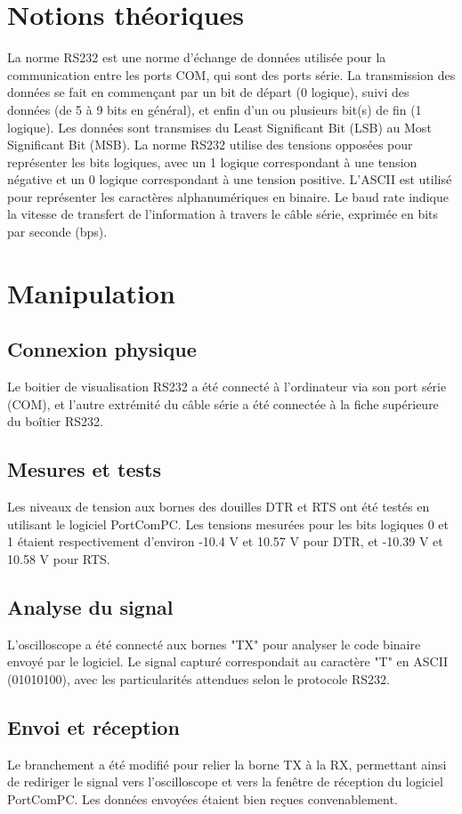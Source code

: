\documentclass[12pt, letterpaper]{report}
\begin{document}
\chapter{Notions théoriques}
La norme RS232 est une norme d'échange de données utilisée pour la communication entre les ports COM, qui sont des ports série. La transmission des données se fait en commençant par un bit de départ (0 logique), suivi des données (de 5 à 9 bits en général), et enfin d'un ou plusieurs bit(s) de fin (1 logique). Les données sont transmises du Least Significant Bit (LSB) au Most Significant Bit (MSB). La norme RS232 utilise des tensions opposées pour représenter les bits logiques, avec un 1 logique correspondant à une tension négative et un 0 logique correspondant à une tension positive. L'ASCII est utilisé pour représenter les caractères alphanumériques en binaire. Le baud rate indique la vitesse de transfert de l'information à travers le câble série, exprimée en bits par seconde (bps).

\chapter{Manipulation}
\section{Connexion physique}
Le boitier de visualisation RS232 a été connecté à l'ordinateur via son port série (COM), et l'autre extrémité du câble série a été connectée à la fiche supérieure du boîtier RS232.
\section{Mesures et tests}
Les niveaux de tension aux bornes des douilles DTR et RTS ont été testés en utilisant le logiciel PortComPC. Les tensions mesurées pour les bits logiques 0 et 1 étaient respectivement d'environ -10.4 V et 10.57 V pour DTR, et -10.39 V et 10.58 V pour RTS.
\section{Analyse du signal}
L'oscilloscope a été connecté aux bornes "TX" pour analyser le code binaire envoyé par le logiciel. Le signal capturé correspondait au caractère "T" en ASCII (01010100), avec les particularités attendues selon le protocole RS232.
\section{Envoi et réception}
Le branchement a été modifié pour relier la borne TX à la RX, permettant ainsi de rediriger le signal vers l'oscilloscope et vers la fenêtre de réception du logiciel PortComPC. Les données envoyées étaient bien reçues convenablement.
\end{document}
